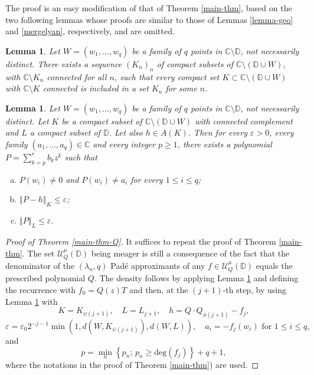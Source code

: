 \documentclass[12pt]{amsart}
\numberwithin{equation}{section}
\newtheorem{lemma}[theorem]{Lemma}
\begin{document}
The proof is an easy modification of that of Theorem \ref{main-thm}, based on the two following lemmas whose proofs are similar to those of Lemmas \ref{lemma-geo} and \ref{mergelyan}, respectively, and are omitted.
\begin{lemma}\label{lemma-geo-Q}Let $W=(w_1,\ldots,w_q)$ be a family of $q$ points in ${\mathbb{C}} \setminus {\mathbb D}$, not necessarily distinct. There exists a sequence $\left(K_n\right)_n$ of compact subsets of ${\mathbb{C}}\setminus ({\mathbb D}\cup W)$, with ${\mathbb{C}} \setminus K_n$ connected for all $n$, such that every compact set $K\subset {\mathbb{C}}\setminus ({\mathbb D}\cup W)$ with ${\mathbb{C}} \setminus K$ connected is included in a set $K_n$ for some $n$.
\end{lemma}

\begin{lemma}\label{mergelyan-Q}Let $W=(w_1,\ldots,w_q)$ be a family of $q$ points in ${\mathbb{C}} \setminus {\mathbb D}$, not necessarily distinct. Let $K$ be a compact subset of ${\mathbb{C}} \setminus ({\mathbb D}\cup W)$ with connected complement and $L$ a compact subset of ${\mathbb D}$. Let also $h\in A(K)$. Then for every $\varepsilon >0$, every family $(a_1,\ldots ,a_q)\in {\mathbb{C}}$ and every integer $p\geq 1$, there exists a polynomial $P=\sum _{k=p}^rb_kz^k$ such that
\begin{enumerate}[a)]
\item $P(w_i)\neq 0$ and $P(w_i)\neq a_i$ for every $1\leq i \leq q$;
\item $\left\Vert P-h \right\Vert _K \leq \varepsilon$;
\item $\left\Vert P\right\Vert _L \leq \varepsilon$.
\end{enumerate}
\end{lemma}
\begin{proof}[Proof of Theorem \ref{main-thm-Q}] It suffices to repeat the proof of Theorem \ref{main-thm}. The set ${\mathcal U}_{Q}^{\mu}({\mathbb D})$ being meager is still a consequence of the fact that the denominator of the $\left(\lambda_n,q\right)$ Pad\'e approximants of any $f\in{\mathcal U}_{Q}^{\mu}({\mathbb D})$ equals the prescribed polynomial $Q$. The density follows by applying Lemma \ref{lemma-geo-Q} and defining the recurrence with $f_0=Q(z)T$ and then, at the $(j+1)$-th step, by using Lemma \ref{mergelyan-Q} with
$$K=K_{\psi(j+1)}, \quad L=L_{j+1},\quad h=Q\cdot Q_{\phi(j+1)}-f_j,$$
$$\varepsilon =\varepsilon _0 2^{-j-1}\min(1,d(W,K_{\psi(j+1)}),d(W,L)),
\quad a_i=-f_{j}(w_i)\text{ for }1\leq i \leq q,$$
and
$$
p=\min_{n}\left\{p_n;\,p_n\geq \text{deg}(f_{j})\right\}+q+1,$$
where the notations in the proof of Theorem \ref{main-thm}) are used.
\end{proof}
\end{document}
